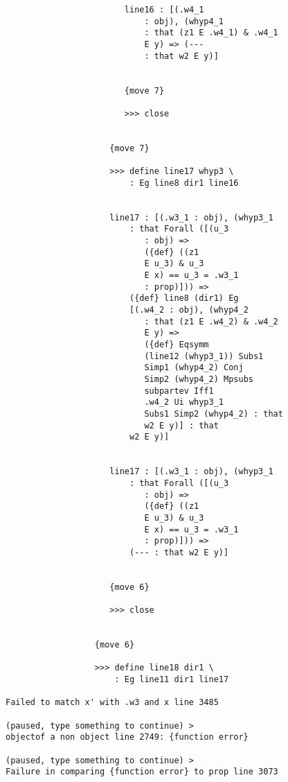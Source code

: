 \documentclass[12pt]{article}
\begin{document}
\begin{verbatim}
                        line16 : [(.w4_1 
                            : obj), (whyp4_1 
                            : that (z1 E .w4_1) & .w4_1 
                            E y) => (--- 
                            : that w2 E y)]


                        {move 7}

                        >>> close


                     {move 7}

                     >>> define line17 whyp3 \
                         : Eg line8 dir1 line16


                     line17 : [(.w3_1 : obj), (whyp3_1 
                         : that Forall ([(u_3 
                            : obj) => 
                            ({def} ((z1 
                            E u_3) & u_3 
                            E x) == u_3 = .w3_1 
                            : prop)])) => 
                         ({def} line8 (dir1) Eg 
                         [(.w4_2 : obj), (whyp4_2 
                            : that (z1 E .w4_2) & .w4_2 
                            E y) => 
                            ({def} Eqsymm 
                            (line12 (whyp3_1)) Subs1 
                            Simp1 (whyp4_2) Conj 
                            Simp2 (whyp4_2) Mpsubs 
                            subpartev Iff1 
                            .w4_2 Ui whyp3_1 
                            Subs1 Simp2 (whyp4_2) : that 
                            w2 E y)] : that 
                         w2 E y)]


                     line17 : [(.w3_1 : obj), (whyp3_1 
                         : that Forall ([(u_3 
                            : obj) => 
                            ({def} ((z1 
                            E u_3) & u_3 
                            E x) == u_3 = .w3_1 
                            : prop)])) => 
                         (--- : that w2 E y)]


                     {move 6}

                     >>> close


                  {move 6}

                  >>> define line18 dir1 \
                      : Eg line11 dir1 line17

Failed to match x' with .w3 and x line 3485

(paused, type something to continue) >
objectof a non object line 2749: {function error}

(paused, type something to continue) >
Failure in comparing {function error} to prop line 3073


\end{verbatim}
\end{document}

